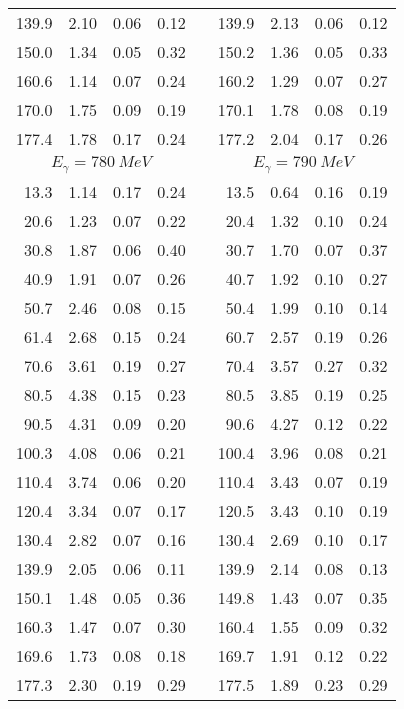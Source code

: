 \begin{table}[htbp]
\begin{center}
\begin{tabular}{|r|r|c|c|l|r|r|c|c|}
139.9 &  2.10 &  0.06 &  0.12 & & 139.9 &  2.13 &  0.06 &  0.12 \\ 
150.0 &  1.34 &  0.05 &  0.32 & & 150.2 &  1.36 &  0.05 &  0.33 \\ 
160.6 &  1.14 &  0.07 &  0.24 & & 160.2 &  1.29 &  0.07 &  0.27 \\ 
170.0 &  1.75 &  0.09 &  0.19 & & 170.1 &  1.78 &  0.08 &  0.19 \\ 
177.4 &  1.78 &  0.17 &  0.24 & & 177.2 &  2.04 &  0.17 &  0.26 \\ 
\hline 
\hline 
\multicolumn{4}{|c|}{ $E_{\gamma}=780~MeV$} & & 
\multicolumn{4}{c|}{ $E_{\gamma}=790~MeV$} \\ 
\cline{1-4} 
\cline{6-9} 
 13.3 &  1.14 &  0.17 &  0.24 & &  13.5 &  0.64 &  0.16 &  0.19 \\ 
 20.6 &  1.23 &  0.07 &  0.22 & &  20.4 &  1.32 &  0.10 &  0.24 \\ 
 30.8 &  1.87 &  0.06 &  0.40 & &  30.7 &  1.70 &  0.07 &  0.37 \\ 
 40.9 &  1.91 &  0.07 &  0.26 & &  40.7 &  1.92 &  0.10 &  0.27 \\ 
 50.7 &  2.46 &  0.08 &  0.15 & &  50.4 &  1.99 &  0.10 &  0.14 \\ 
 61.4 &  2.68 &  0.15 &  0.24 & &  60.7 &  2.57 &  0.19 &  0.26 \\ 
 70.6 &  3.61 &  0.19 &  0.27 & &  70.4 &  3.57 &  0.27 &  0.32 \\ 
 80.5 &  4.38 &  0.15 &  0.23 & &  80.5 &  3.85 &  0.19 &  0.25 \\ 
 90.5 &  4.31 &  0.09 &  0.20 & &  90.6 &  4.27 &  0.12 &  0.22 \\ 
100.3 &  4.08 &  0.06 &  0.21 & & 100.4 &  3.96 &  0.08 &  0.21 \\ 
110.4 &  3.74 &  0.06 &  0.20 & & 110.4 &  3.43 &  0.07 &  0.19 \\ 
120.4 &  3.34 &  0.07 &  0.17 & & 120.5 &  3.43 &  0.10 &  0.19 \\ 
130.4 &  2.82 &  0.07 &  0.16 & & 130.4 &  2.69 &  0.10 &  0.17 \\ 
139.9 &  2.05 &  0.06 &  0.11 & & 139.9 &  2.14 &  0.08 &  0.13 \\ 
150.1 &  1.48 &  0.05 &  0.36 & & 149.8 &  1.43 &  0.07 &  0.35 \\ 
160.3 &  1.47 &  0.07 &  0.30 & & 160.4 &  1.55 &  0.09 &  0.32 \\ 
169.6 &  1.73 &  0.08 &  0.18 & & 169.7 &  1.91 &  0.12 &  0.22 \\ 
177.3 &  2.30 &  0.19 &  0.29 & & 177.5 &  1.89 &  0.23 &  0.29 \\ 
\cline{1-4} 
\cline{6-9} 
\end{tabular} 

\end{center} 
\end{table}

